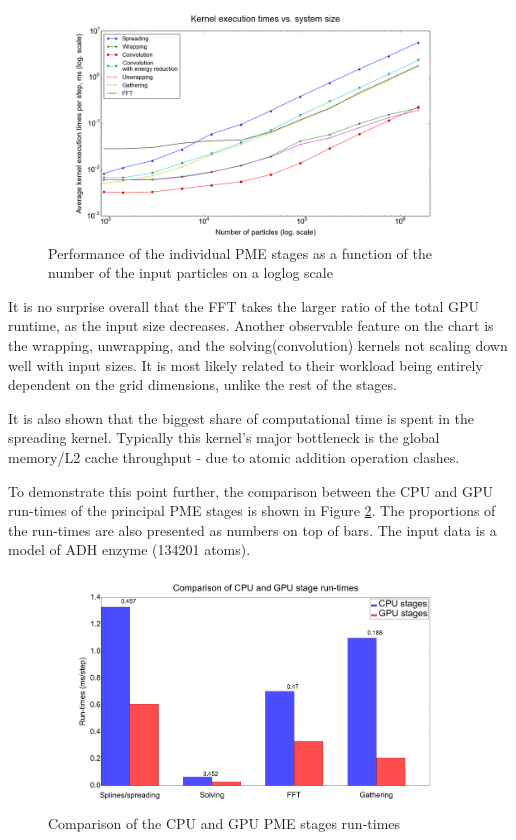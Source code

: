 \documentclass[12pt,a4paper,notitlepage]{report}
\begin{document}
\begin{figure} [h!]
    \centering
    \includegraphics[width=1\textwidth]{pics/kernels-noconcur-2.png}
    \caption{Performance of the individual PME stages as a function of the number of the input particles on a loglog scale}
    \label{fig:kernels}
\end{figure}
\FloatBarrier

It is no surprise overall that the FFT takes the larger ratio of the total GPU runtime, as the input size decreases. Another observable feature on the chart is the wrapping, unwrapping, and the solving(convolution) kernels not scaling down well with input sizes. It is most likely related to their workload being entirely dependent on the grid dimensions, unlike the rest of the stages.

It is also shown that the biggest share of computational time is spent in the spreading kernel. Typically this kernel's major bottleneck is the global memory/L2 cache throughput - due to atomic addition operation clashes. 

To demonstrate this point further, the comparison between the CPU and GPU run-times of the principal PME stages is shown in Figure \ref{fig:bar}. The proportions of the run-times are also presented as numbers on top of bars. The input data is a model of ADH enzyme (134201 atoms).

\begin{figure} [h!]
    \centering
    \includegraphics[width=1\textwidth]{pics/bar.png}
    \caption{Comparison of the CPU and GPU PME stages run-times}
    \label{fig:bar}
\end{figure}
\FloatBarrier
\end{document}
